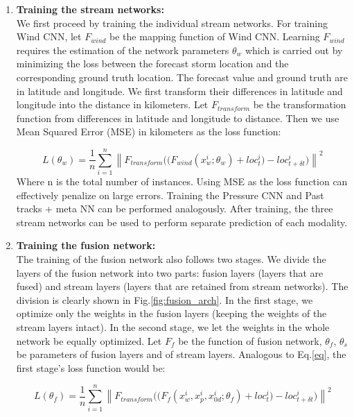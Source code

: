 \begin{enumerate}[leftmargin=2em]
	\item \textbf{Training the stream networks: }\\
	We first proceed by training the individual stream networks. For training Wind CNN, let $F_{wind}$ be the mapping function of Wind CNN. Learning $F_{wind}$ requires the estimation of the network parameters $\theta_w$ which is carried out by minimizing the loss between the forecast storm location and the corresponding ground truth location. The forecast value and ground truth are in latitude and longitude. We first transform their differences in latitude and longitude into the distance in kilometers. Let $F_{transform}$ be the transformation function from differences in latitude and longitude to distance. Then we use Mean Squared Error (MSE) in kilometers as the loss function:
	
	\begin{equation}
	\label{eq}
	L(\theta_w) = \frac{1}{n}\sum_{i=1}^{n} \left \| {F_{transform}((F_{wind}(x_w^i; \theta_w)} + loc^i_{t} ) - loc^i_{t+\delta t} ) \right \| ^2
	\end{equation}
	Where n is the total number of instances. Using MSE as the loss function can effectively penalize on large errors. Training the Pressure CNN and Past tracks + meta NN can be performed analogously. After training, the three stream networks can be used to perform separate prediction of each modality. 
	\item \textbf{Training the fusion network: }\\
	The training of the fusion network also follows two stages. We divide the layers of the fusion network into two parts: fusion layers (layers that are fused) and stream layers (layers that are retained from stream networks). The division is clearly shown in Fig.\ref{fig:fusion_arch}. In the first stage, we optimize only the weights in the fusion layers (keeping the weights of the stream layers intact). In the second stage, we let the weights in the whole network be equally optimized. Let $F_{f}$ be the function of fusion network, $\theta_{f}$, $\theta_{s}$ be parameters of fusion layers and of stream layers. Analogous to Eq.\ref{eq}, the first stage's loss function would be:
	
	\begin{equation}
	\label{eq_fusion_1}
	L(\theta_{f}) = \frac{1}{n}\sum_{i=1}^{n} \left \| {F_{transform}((F_{f}(x_w^i, x_p^i, x_{0d}^i; \theta_{f})} + loc^i_{t} ) - loc^i_{t+\delta t} ) \right \| ^2
	\end{equation}
	

\end{enumerate}
